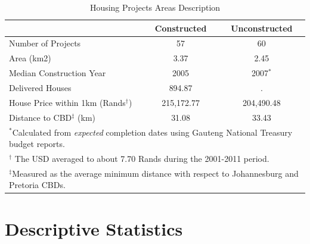 \documentclass[12pt]{article}
\begin{document}
\begin{table}[t!]
\centering
\caption{Housing Projects Areas Description}\label{table:projectdescriptives}
\vspace{-2mm}
\begin{tabular}{l*{1}{cc}}
\toprule
  &Constructed &Unconstructed \\
\midrule
Number of Projects  &       57 &       60 \\
Area (km2) &       3.37 &       2.45  \\
Median Construction Year & 2005 & 2007$^*$\\
Delivered Houses  &     894.87 & .      \\
House Price within 1km (Rands$^\dagger$) &   215,172.77   &   204,490.48   \\
Distance to CBD$^\ddagger$ (km) &  31.08  &     33.43   \\
\bottomrule
\multicolumn{3}{l}{\scriptsize $^*$Calculated from {\it expected} completion dates using Gauteng National Treasury budget reports.}\\[-.5em]
\multicolumn{3}{l}{\scriptsize $^\dagger$ The USD averaged to about 7.70 Rands during the 2001-2011 period.}\\[-.5em]
\multicolumn{3}{l}{\scriptsize $^\ddagger$Measured as the average minimum distance with respect to Johannesburg and Pretoria CBDs. }
\end{tabular}
\end{table} 

\section{Descriptive Statistics}\label{section:descriptives}


\end{document}
